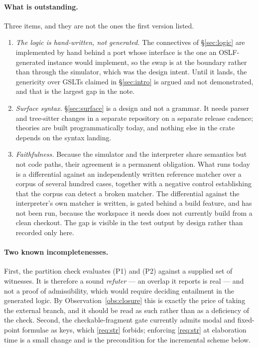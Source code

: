 \documentclass[11pt,a4paper]{article}
\theoremstyle{plain}
\theoremstyle{definition}
\theoremstyle{remark}
\begin{document}
\paragraph{What is outstanding.} Three items, and they are not the ones the first version listed.
\begin{enumerate}[leftmargin=2.2em]
\item \emph{The logic is hand-written, not generated.} The connectives of \S\ref{sec:logic} are
implemented by hand behind a port whose interface is the one an OSLF-generated instance would
implement, so the swap is at the boundary rather than through the simulator, which was the design
intent. Until it lands, the genericity over GSLTs claimed in \S\ref{sec:intro} is argued and not
demonstrated, and that is the largest gap in the note.
\item \emph{Surface syntax.} \S\ref{sec:surface} is a design and not a grammar. It needs parser and
tree-sitter changes in a separate repository on a separate release cadence; theories are built
programmatically today, and nothing else in the crate depends on the syntax landing.
\item \emph{Faithfulness.} Because the simulator and the interpreter share semantics but not code
paths, their agreement is a permanent obligation. What runs today is a differential against an
independently written reference matcher over a corpus of several hundred cases, together with a
negative control establishing that the corpus can detect a broken matcher. The differential against
the interpreter's own matcher is written, is gated behind a build feature, and has not been run,
because the workspace it needs does not currently build from a clean checkout. The gap is visible in
the test output by design rather than recorded only here.
\end{enumerate}

\paragraph{Two known incompletenesses.} First, the partition check evaluates (P1) and (P2) against a
supplied set of witnesses. It is therefore a sound \emph{refuter} --- an overlap it reports is real
--- and not a proof of admissibility, which would require deciding entailment in the generated logic.
By Observation~\ref{obs:closure} this is exactly the price of taking the external branch, and it
should be read as such rather than as a deficiency of the check. Second, the checkable-fragment gate
currently admits modal and fixed-point formulae as keys, which \ref{req:str} forbids; enforcing
\ref{req:str} at elaboration time is a small change and is the precondition for the incremental
scheme below.
\end{document}
